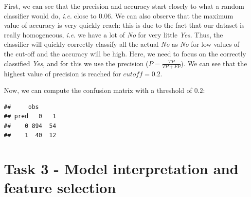 \documentclass[
  12pt,
  oneside]{report}
\begin{document}
First, we can see that the precision and accuracy start closely to what a random classifier would do, \emph{i.e.} close to \(0.06\). We can also observe that the maximum value of accuracy is very quickly reach: this is due to the fact that our dataset is really homogeneous, \emph{i.e.} we have a lot of \emph{No} for very little \emph{Yes}. Thus, the classifier will quickly correctly classify all the actual \emph{No} as \emph{No} for low values of the cut-off and the accuracy will be high. Here, we need to focus on the correctly classified \emph{Yes}, and for this we use the precision (\(P = \frac{TP}{TP+FP}\)). We can see that the highest value of precision is reached for \(cutoff = 0.2\).

Now, we can compute the confusion matrix with a threshold of \(0.2\):

\begin{verbatim}
##     obs
## pred   0   1
##    0 894  54
##    1  40  12
\end{verbatim}

\hypertarget{task-3---model-interpretation-and-feature-selection}{%
\chapter{Task 3 - Model interpretation and feature selection}\label{task-3---model-interpretation-and-feature-selection}}
\end{document}
